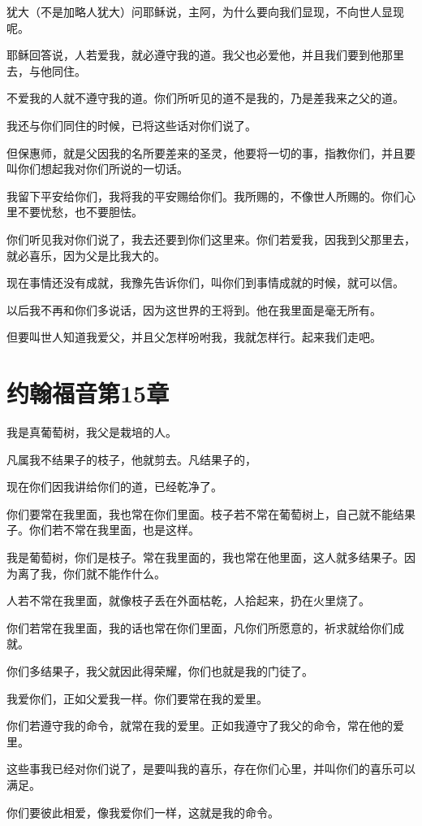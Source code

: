 \documentclass[12pt,oneside]{book}
\begin{document}
犹大（不是加略人犹大）问耶稣说，主阿，为什么要向我们显现，不向世人显现呢。

耶稣回答说，人若爱我，就必遵守我的道。我父也必爱他，并且我们要到他那里去，与他同住。

不爱我的人就不遵守我的道。你们所听见的道不是我的，乃是差我来之父的道。

我还与你们同住的时候，已将这些话对你们说了。

但保惠师，就是父因我的名所要差来的圣灵，他要将一切的事，指教你们，并且要叫你们想起我对你们所说的一切话。

我留下平安给你们，我将我的平安赐给你们。我所赐的，不像世人所赐的。你们心里不要忧愁，也不要胆怯。

你们听见我对你们说了，我去还要到你们这里来。你们若爱我，因我到父那里去，就必喜乐，因为父是比我大的。

现在事情还没有成就，我豫先告诉你们，叫你们到事情成就的时候，就可以信。

以后我不再和你们多说话，因为这世界的王将到。他在我里面是毫无所有。

但要叫世人知道我爱父，并且父怎样吩咐我，我就怎样行。起来我们走吧。

\chapter{约翰福音第15章}
我是真葡萄树，我父是栽培的人。

凡属我不结果子的枝子，他就剪去。凡结果子的，

现在你们因我讲给你们的道，已经乾净了。

你们要常在我里面，我也常在你们里面。枝子若不常在葡萄树上，自己就不能结果子。你们若不常在我里面，也是这样。

我是葡萄树，你们是枝子。常在我里面的，我也常在他里面，这人就多结果子。因为离了我，你们就不能作什么。

人若不常在我里面，就像枝子丢在外面枯乾，人拾起来，扔在火里烧了。

你们若常在我里面，我的话也常在你们里面，凡你们所愿意的，祈求就给你们成就。

你们多结果子，我父就因此得荣耀，你们也就是我的门徒了。

我爱你们，正如父爱我一样。你们要常在我的爱里。

你们若遵守我的命令，就常在我的爱里。正如我遵守了我父的命令，常在他的爱里。

这些事我已经对你们说了，是要叫我的喜乐，存在你们心里，并叫你们的喜乐可以满足。

你们要彼此相爱，像我爱你们一样，这就是我的命令。
\end{document}
